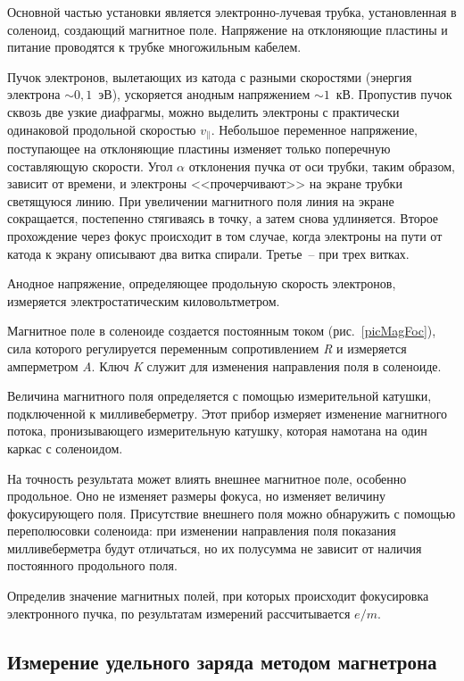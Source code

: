 \documentclass[pscyr]{hedwork}
\begin{document}
  Основной частью установки является электронно-лучевая трубка, установленная в
  соленоид, создающий магнитное поле. Напряжение на отклоняющие пластины и
  питание проводятся к трубке многожильным кабелем.

  Пучок электронов, вылетающих из катода с разными скоростями (энергия электрона
  \( \sim 0,\!1 \)~эВ), ускоряется анодным напряжением \( \sim 1 \)~кВ.
  Пропустив пучок сквозь две узкие диафрагмы, можно выделить электроны с
  практически одинаковой продольной скоростью \( v_\| \). Небольшое переменное
  напряжение, поступающее на отклоняющие пластины изменяет только поперечную
  составляющую скорости. Угол \( \alpha \) отклонения пучка от оси трубки, таким
  образом, зависит от времени, и электроны <<прочерчивают>> на экране трубки
  светящуюся линию. При увеличении магнитного поля линия на экране сокращается,
  постепенно стягиваясь в точку, а затем снова удлиняется. Второе прохождение
  через фокус происходит в том случае, когда электроны на пути от катода к
  экрану описывают два витка спирали. Третье~-- при трех витках.

  Анодное напряжение, определяющее продольную скорость электронов, измеряется
  электростатическим киловольтметром.

  Магнитное поле в соленоиде создается постоянным током (рис.~\ref{picMagFoc}),
  сила которого регулируется переменным сопротивлением \emph{R} и измеряется
  амперметром \emph{A}. Ключ \emph{K} служит для изменения направления поля в
  соленоиде.

  Величина магнитного поля определяется с помощью измерительной катушки,
  подключенной к милливеберметру. Этот прибор измеряет изменение магнитного
  потока, пронизывающего измерительную катушку, которая намотана на один каркас
  с соленоидом.

  На точность результата может влиять внешнее магнитное поле, особенно
  продольное. Оно не изменяет размеры фокуса, но изменяет величину фокусирующего
  поля. Присутствие внешнего поля можно обнаружить с помощью переполюсовки
  соленоида: при изменении направления поля показания милливеберметра будут
  отличаться, но их полусумма не зависит от наличия постоянного продольного
  поля.

  Определив значение магнитных полей, при которых происходит фокусировка
  электронного пучка, по результатам измерений рассчитывается \( e/m \).

  \subsection{Измерение удельного заряда методом магнетрона}
\end{document}
